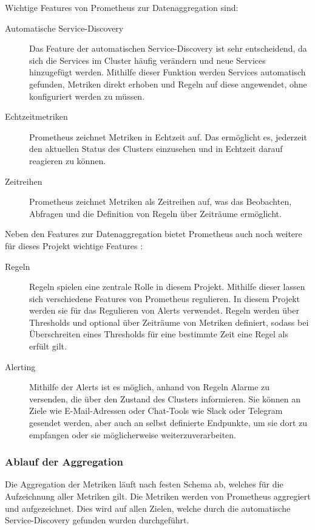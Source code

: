 \documentclass[a4paper,10pt]{scrartcl}
\begin{document}
Wichtige Features von Prometheus zur Datenaggregation sind:
\begin{description}

\item[Automatische Service-Discovery]
Das Feature der automatischen Service-Discovery ist sehr entscheidend, da sich die Services im Cluster häufig verändern und neue Services hinzugefügt werden. Mithilfe dieser Funktion werden Services automatisch gefunden, Metriken direkt erhoben und Regeln auf diese angewendet, ohne konfiguriert werden zu müssen.
\item[Echtzeitmetriken]
Prometheus zeichnet Metriken in Echtzeit auf. Das ermöglicht es, jederzeit den aktuellen Status des Clusters einzusehen und in Echtzeit darauf reagieren zu können.
\item[Zeitreihen]
Prometheus zeichnet Metriken als Zeitreihen auf, was das Beobachten, Abfragen und die Definition von Regeln über Zeiträume ermöglicht. 

\end{description}


Neben den Features zur Datenaggregation bietet Prometheus auch noch weitere für dieses Projekt wichtige Features :
\begin{description}
\item[Regeln]
Regeln spielen eine zentrale Rolle in diesem Projekt. Mithilfe dieser lassen sich verschiedene Features von Prometheus regulieren. In diesem Projekt werden sie für das Regulieren von Alerts verwendet.
Regeln werden über Thresholds und optional über Zeiträume von Metriken definiert, sodass bei Überschreiten eines Thresholds für eine bestimmte Zeit eine Regel als erfült gilt.
\item[Alerting]
Mithilfe der Alerts ist es möglich, anhand von Regeln Alarme zu versenden, die über den Zustand des Clusters informieren. Sie können an Ziele wie E-Mail-Adressen oder Chat-Tools wie Slack oder Telegram gesendet werden, aber auch  an selbst definierte Endpunkte, um sie dort zu empfangen oder sie möglicherweise weiterzuverarbeiten.

\end{description}
\pagebreak
\newpage
\subsubsection{Ablauf der Aggregation}

Die Aggregation der Metriken läuft nach festen Schema ab, welches für die Aufzeichnung aller Metriken gilt.
Die Metriken werden von Prometheus aggregiert und aufgezeichnet. Dies wird auf allen Zielen, welche durch die automatische Service-Discovery gefunden wurden durchgeführt.\\
\end{document}
